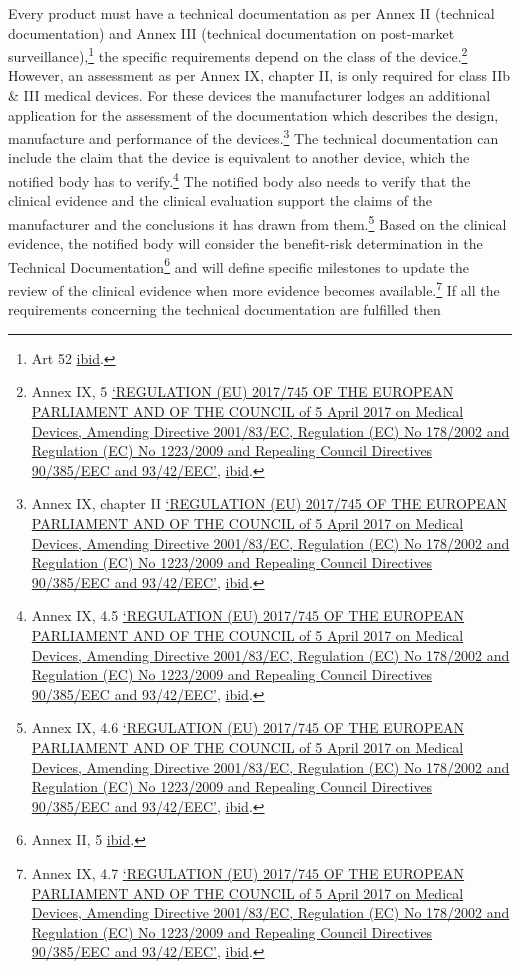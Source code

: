 \documentclass[
]{scrartcl}
\begin{document}
Every product must have a technical documentation as per Annex II (technical documentation) and Annex III (technical documentation on post-market surveillance),\footnote{Art 52 \protect\hyperlink{ref-REGULATIONEU2017a}{ibid}.} the specific requirements depend on the class of the device.\footnote{Annex IX, 5 \protect\hyperlink{ref-REGULATIONEU2017a}{{`{REGULATION} ({EU}) 2017/745 {OF THE EUROPEAN PARLIAMENT AND OF THE COUNCIL} of 5 {April} 2017 on Medical Devices, Amending {Directive} 2001/83/{EC}, {Regulation} ({EC}) {No} 178/2002 and {Regulation} ({EC}) {No} 1223/2009 and Repealing {Council Directives} 90/385/{EEC} and 93/42/{EEC}'}}, \protect\hyperlink{ref-REGULATIONEU2017a}{ibid}.} However, an assessment as per Annex IX, chapter II, is only required for class IIb \& III medical devices. For these devices the manufacturer lodges an additional application for the assessment of the documentation which describes the design, manufacture and performance of the devices.\footnote{Annex IX, chapter II \protect\hyperlink{ref-REGULATIONEU2017a}{{`{REGULATION} ({EU}) 2017/745 {OF THE EUROPEAN PARLIAMENT AND OF THE COUNCIL} of 5 {April} 2017 on Medical Devices, Amending {Directive} 2001/83/{EC}, {Regulation} ({EC}) {No} 178/2002 and {Regulation} ({EC}) {No} 1223/2009 and Repealing {Council Directives} 90/385/{EEC} and 93/42/{EEC}'}}, \protect\hyperlink{ref-REGULATIONEU2017a}{ibid}.} The technical documentation can include the claim that the device is equivalent to another device, which the notified body has to verify.\footnote{Annex IX, 4.5 \protect\hyperlink{ref-REGULATIONEU2017a}{{`{REGULATION} ({EU}) 2017/745 {OF THE EUROPEAN PARLIAMENT AND OF THE COUNCIL} of 5 {April} 2017 on Medical Devices, Amending {Directive} 2001/83/{EC}, {Regulation} ({EC}) {No} 178/2002 and {Regulation} ({EC}) {No} 1223/2009 and Repealing {Council Directives} 90/385/{EEC} and 93/42/{EEC}'}}, \protect\hyperlink{ref-REGULATIONEU2017a}{ibid}.} The notified body also needs to verify that the clinical evidence and the clinical evaluation support the claims of the manufacturer and the conclusions it has drawn from them.\footnote{Annex IX, 4.6 \protect\hyperlink{ref-REGULATIONEU2017a}{{`{REGULATION} ({EU}) 2017/745 {OF THE EUROPEAN PARLIAMENT AND OF THE COUNCIL} of 5 {April} 2017 on Medical Devices, Amending {Directive} 2001/83/{EC}, {Regulation} ({EC}) {No} 178/2002 and {Regulation} ({EC}) {No} 1223/2009 and Repealing {Council Directives} 90/385/{EEC} and 93/42/{EEC}'}}, \protect\hyperlink{ref-REGULATIONEU2017a}{ibid}.} Based on the clinical evidence, the notified body will consider the benefit-risk determination in the Technical Documentation\footnote{Annex II, 5 \protect\hyperlink{ref-REGULATIONEU2017a}{ibid}.} and will define specific milestones to update the review of the clinical evidence when more evidence becomes available.\footnote{Annex IX, 4.7 \protect\hyperlink{ref-REGULATIONEU2017a}{{`{REGULATION} ({EU}) 2017/745 {OF THE EUROPEAN PARLIAMENT AND OF THE COUNCIL} of 5 {April} 2017 on Medical Devices, Amending {Directive} 2001/83/{EC}, {Regulation} ({EC}) {No} 178/2002 and {Regulation} ({EC}) {No} 1223/2009 and Repealing {Council Directives} 90/385/{EEC} and 93/42/{EEC}'}}, \protect\hyperlink{ref-REGULATIONEU2017a}{ibid}.} If all the requirements concerning the technical documentation are fulfilled then 
\end{document}

